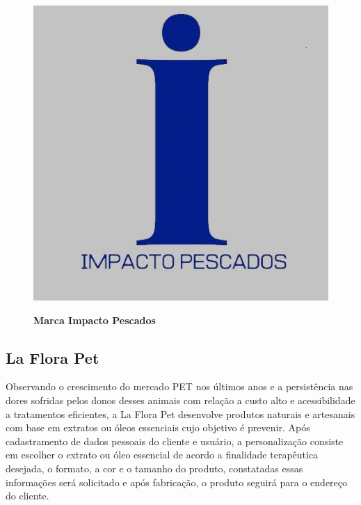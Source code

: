 \begin{figure}[H]
\centering
\caption{\textbf{Marca Impacto Pescados}}
\includegraphics[scale=0.4]{Imagens/impacto_pescados.jpg}
\label{figura_23}
\end{figure}


\subsection{La Flora Pet}

Observando o crescimento do mercado PET nos últimos anos e a persistência nas dores sofridas pelos donos desses animais com relação a custo alto e acessibilidade a tratamentos eficientes, a La Flora Pet desenvolve produtos naturais e artesanais com base em extratos ou óleos essenciais cujo objetivo é prevenir. Após cadastramento de dados pessoais do cliente e usuário, a personalização consiste em escolher o extrato ou óleo essencial de acordo a finalidade terapêutica desejada, o formato, a cor e o tamanho do produto, constatadas essas informações será solicitado e após fabricação, o produto seguirá para o endereço do cliente.


